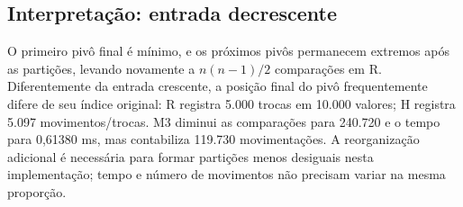 \subsection*{Interpretação: entrada decrescente}
O primeiro pivô final é mínimo, e os próximos pivôs permanecem extremos após as partições, levando novamente a $n(n-1)/2$ comparações em R. Diferentemente da entrada crescente, a posição final do pivô frequentemente difere de seu índice original: R registra 5.000 trocas em 10.000 valores; H registra 5.097 movimentos/trocas. M3 diminui as comparações para 240.720 e o tempo para 0,61380 ms, mas contabiliza 119.730 movimentações. A reorganização adicional é necessária para formar partições menos desiguais nesta implementação; tempo e número de movimentos não precisam variar na mesma proporção.
